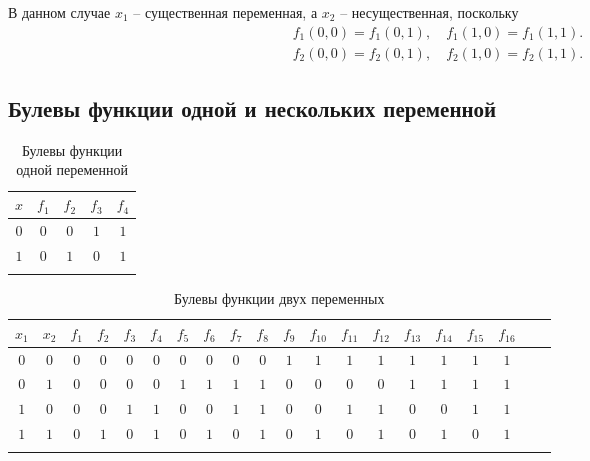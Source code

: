 \documentclass[a5paper, 11pt]{extarticle}
\theoremstyle{definition}
\theoremstyle{definition}
\theoremstyle{definition}
\numberwithin{figure}{section}
\numberwithin{table}{section}
\begin{document}
В данном случае \(x_1\) -- существенная переменная, а \(x_2\) -- несущественная, поскольку
\begin{gather*}
    f_1(0, 0) = f_1(0, 1),
    \quad
    f_1(1, 0) = f_1(1, 1).
    \\
    f_2(0, 0) = f_2(0, 1),
    \quad
    f_2(1, 0) = f_2(1, 1).
\end{gather*}

\subsection{Булевы функции одной и нескольких переменной}

\begin{table}[H]
    \renewcommand*{\arraystretch}{1.5}
    \begin{longtable}{|c|c|c|c|c|}
        \hline
        \(x\) & \(f_1\) & \(f_2\) & \(f_3\) & \(f_4\) \\
        \hline
        \(0\) & \(0\)   & \(0\)   & \(1\)   & \(1\)   \\
        \hline
        \(1\) & \(0\)   & \(1\)   & \(0\)   & \(1\)   \\
        \hline
        \caption{Булевы функции одной переменной}
    \end{longtable}
\end{table}

\begin{table}[H]
    \setlength{\tabcolsep}{3pt}
    \renewcommand*{\arraystretch}{1.5}
    \begin{longtable}{|c|c!{\vrule width 1.2pt}Sc|c|c|c|c|c|c|c|c|c|c|c|c|c|c|c|c|}
        \hline
        \(x_1\) & \(x_2\) & \(f_1\) & \(f_2\) & \(f_3\) & \(f_4\) & \(f_5\) & \(f_6\) & \(f_7\) & \(f_8\) & \(f_9\) & \(f_{10}\) & \(f_{11}\) & \(f_{12}\) & \(f_{13}\) & \(f_{14}\) & \(f_{15}\) & \(f_{16}\) \\
        \hline
        \(0\)   & \(0\)   & \(0\)   & \(0\)   & \(0\)   & \(0\)   & \(0\)   & \(0\)   & \(0\)   & \(0\)   & \(1\)   & \(1\)      & \(1\)      & \(1\)      & \(1\)      & \(1\)      & \(1\)      & \(1\)      \\
        \hline
        \(0\)   & \(1\)   & \(0\)   & \(0\)   & \(0\)   & \(0\)   & \(1\)   & \(1\)   & \(1\)   & \(1\)   & \(0\)   & \(0\)      & \(0\)      & \(0\)      & \(1\)      & \(1\)      & \(1\)      & \(1\)      \\
        \hline
        \(1\)   & \(0\)   & \(0\)   & \(0\)   & \(1\)   & \(1\)   & \(0\)   & \(0\)   & \(1\)   & \(1\)   & \(0\)   & \(0\)      & \(1\)      & \(1\)      & \(0\)      & \(0\)      & \(1\)      & \(1\)      \\
        \hline
        \(1\)   & \(1\)   & \(0\)   & \(1\)   & \(0\)   & \(1\)   & \(0\)   & \(1\)   & \(0\)   & \(1\)   & \(0\)   & \(1\)      & \(0\)      & \(1\)      & \(0\)      & \(1\)      & \(0\)      & \(1\)      \\
        \hline
        \caption{Булевы функции двух переменных}
    \end{longtable}
\end{table}
\end{document}
